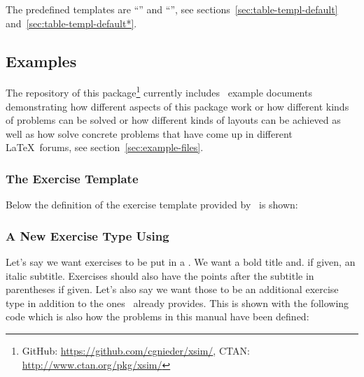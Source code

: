 \documentclass{xsim-manual}
\begin{document}
The predefined templates are \enquote{} and
\enquote{}, see sections~\vref{sec:table-templ-default}
and~\vref{sec:table-templ-default*}.

\subsection{Examples}\label{sec:template-examples}

The repository of this package\footnote{GitHub:
  \url{https://github.com/cgnieder/xsim/}, CTAN:
  \url{http://www.ctan.org/pkg/xsim/}} currently includes
\theexamplefiles~example documents demonstrating how different aspects of this
package work or how different kinds of problems can be solved or how different
kinds of layouts can be achieved as well as how solve concrete problems that
have come up in different \LaTeX\ forums, see
section~\vref{sec:example-files}.

\subsubsection{The  Exercise Template}\label{sec:exercise-templ-default}

Below the definition of the  exercise
template provided by \xsim\ is shown:

\begin{sourcecode}
  {\par}
\end{sourcecode}

\subsubsection{A New Exercise Type Using }
Let's say we want exercises to be put in a . We want a bold
title and. if given, an italic subtitle.  Exercises should also have the
points after the subtitle in parentheses if given.  Let's also say we want
those to be an additional exercise type in addition to the ones \xsim\ already
provides.  This is shown with the following code which is also how the
problems in this manual have been defined:
\end{document}
